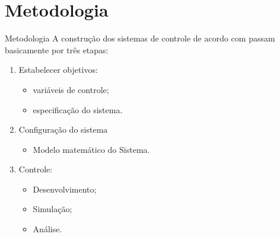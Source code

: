 \section{Metodologia}

\begin{frame}{Metodologia}
A construção dos sistemas de controle de acordo com \cite{dorf2011modern} passam basicamente por três etapas:

\vspace{1cm}

\begin{enumerate}
\item Estabelecer objetivos: 
    	\begin{itemize}
	\item variáveis de controle;
	\item especificação do sistema.
	\end{itemize}
\item Configuração do sistema
	\begin{itemize}
	\item Modelo matemático do Sistema.
	\end{itemize}
\item Controle:
	\begin{itemize}
	\item Desenvolvimento;
	\item Simulação;
	\item Análise.
	\end{itemize}
\end{enumerate}
\end{frame}





